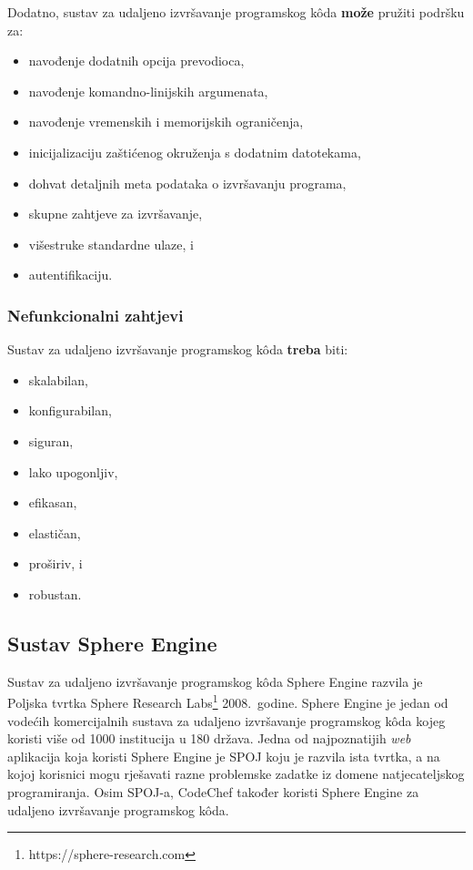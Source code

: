 \documentclass[times, utf8, diplomski]{fer}
\begin{document}
Dodatno, sustav za udaljeno izvršavanje programskog kôda \textbf{može} pružiti podršku za:
\begin{itemize}
    \item navođenje dodatnih opcija prevodioca,
    \item navođenje komandno-linijskih argumenata,
    \item navođenje vremenskih i memorijskih ograničenja,
    \item inicijalizaciju zaštićenog okruženja s dodatnim datotekama,
    \item dohvat detaljnih meta podataka o izvršavanju programa,
    \item skupne zahtjeve za izvršavanje,
    \item višestruke standardne ulaze, i
    \item autentifikaciju.
\end{itemize}

\subsubsection{Nefunkcionalni zahtjevi}
Sustav za udaljeno izvršavanje programskog kôda \textbf{treba} biti:
\begin{itemize}
    \item skalabilan,
    \item konfigurabilan,
    \item siguran,
    \item lako upogonljiv,
    \item efikasan,
    \item elastičan,
    \item proširiv, i
    \item robustan.
\end{itemize}

\subsection{Sustav Sphere Engine}
Sustav za udaljeno izvršavanje programskog kôda Sphere Engine razvila je Poljska tvrtka Sphere Research Labs\footnote{https://sphere-research.com} 2008.\ godine. Sphere Engine je jedan od vodećih komercijalnih sustava za udaljeno izvršavanje programskog kôda kojeg koristi više od 1000 institucija u 180 država. Jedna od najpoznatijih \textit{web} aplikacija koja koristi Sphere Engine je SPOJ \citep{SPOJ} koju je razvila ista tvrtka, a na kojoj korisnici mogu rješavati razne problemske zadatke iz domene natjecateljskog programiranja. Osim SPOJ-a, CodeChef \citep{CodeChef} također koristi Sphere Engine za udaljeno izvršavanje programskog kôda.
\end{document}
